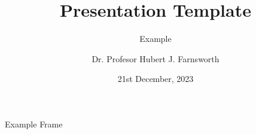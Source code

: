 \documentclass[aspectratio=43]{beamer}
\title{Presentation Template}
\subtitle{Example}
\author[TL]{Dr. Profesor Hubert J. Farnsworth}
\institute{West University of Timișoara}
\date{21st December, 2023}
\begin{document}
\titleframe


\begin{frame}{Example Frame}
\end{frame}
\end{document}

